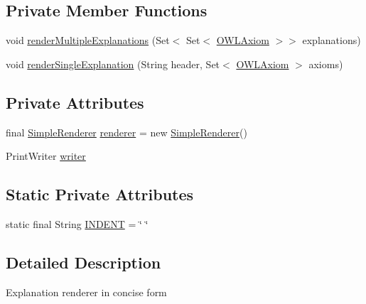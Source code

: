 \subsection*{Private Member Functions}
\begin{DoxyCompactItemize}
\item 
void \hyperlink{classcom_1_1clarkparsia_1_1owlapi_1_1explanation_1_1io_1_1_concise_explanation_renderer_a88bdce16aa6f45f037dbeafb5ccbb82b}{render\-Multiple\-Explanations} (Set$<$ Set$<$ \hyperlink{interfaceorg_1_1semanticweb_1_1owlapi_1_1model_1_1_o_w_l_axiom}{O\-W\-L\-Axiom} $>$$>$ explanations)
\item 
void \hyperlink{classcom_1_1clarkparsia_1_1owlapi_1_1explanation_1_1io_1_1_concise_explanation_renderer_ab5a62d60d6c89014859cb2c19be6a0e9}{render\-Single\-Explanation} (String header, Set$<$ \hyperlink{interfaceorg_1_1semanticweb_1_1owlapi_1_1model_1_1_o_w_l_axiom}{O\-W\-L\-Axiom} $>$ axioms)
\end{DoxyCompactItemize}
\subsection*{Private Attributes}
\begin{DoxyCompactItemize}
\item 
final \hyperlink{classorg_1_1semanticweb_1_1owlapi_1_1util_1_1_simple_renderer}{Simple\-Renderer} \hyperlink{classcom_1_1clarkparsia_1_1owlapi_1_1explanation_1_1io_1_1_concise_explanation_renderer_a7ec18dddcd12308ebf4cc9f793661c32}{renderer} = new \hyperlink{classorg_1_1semanticweb_1_1owlapi_1_1util_1_1_simple_renderer}{Simple\-Renderer}()
\item 
Print\-Writer \hyperlink{classcom_1_1clarkparsia_1_1owlapi_1_1explanation_1_1io_1_1_concise_explanation_renderer_a4b990bdd27662df2c81700e17eb795b4}{writer}
\end{DoxyCompactItemize}
\subsection*{Static Private Attributes}
\begin{DoxyCompactItemize}
\item 
static final String \hyperlink{classcom_1_1clarkparsia_1_1owlapi_1_1explanation_1_1io_1_1_concise_explanation_renderer_a2699656c5225782f6c561b5e7f623e74}{I\-N\-D\-E\-N\-T} = \char`\"{} \char`\"{}
\end{DoxyCompactItemize}


\subsection{Detailed Description}
Explanation renderer in concise form 

